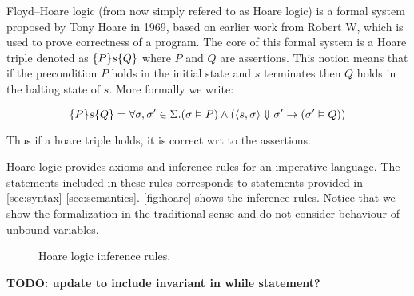 Floyd–Hoare logic (from now simply refered to as Hoare logic) is a formal system proposed by Tony Hoare in 1969,
based on earlier work from Robert W, which is used to prove correctness of a program.
The core of this formal system is a Hoare triple denoted as $\{P\}s\{Q\}$
where $P$ and $Q$ are assertions. This notion means that if the precondition $P$ holds in the initial state
and $s$ terminates then $Q$ holds in the halting state of $s$. More formally we write:

$$\{P\}s\{Q\} = \forall \sigma, \sigma' \in \Sigma. (\sigma \vDash P) \wedge ( \langle s, \sigma \rangle \Downarrow \sigma' \rightarrow (\sigma' \vDash Q))$$

Thus if a hoare triple holds, it is correct wrt to the assertions.

Hoare logic provides axioms and inference rules for an imperative language.
The statements included in these rules corresponds to statements provided in \autoref{sec:syntax}-\autoref{sec:semantics}. \autoref{fig:hoare} shows the inference rules.
Notice that we show the formalization in the traditional sense and do not consider behaviour of unbound variables.

\begin{figure}[h!]

\inference[HSkip]{}
{}

\inference[HAssign]{}
{}

{}

{}

{}

{}

\label{fig:hoare}
\caption{Hoare logic inference rules.}
\end{figure}

\textbf{TODO: update to include invariant in while statement?}


